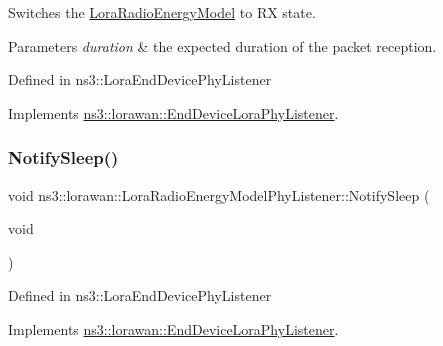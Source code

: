 Switches the \hyperlink{classns3_1_1lorawan_1_1LoraRadioEnergyModel}{Lora\+Radio\+Energy\+Model} to RX state. 


\begin{DoxyParams}{Parameters}
{\em duration} & the expected duration of the packet reception.\\
\hline
\end{DoxyParams}
Defined in ns3\+::\+Lora\+End\+Device\+Phy\+Listener 

Implements \hyperlink{classns3_1_1lorawan_1_1EndDeviceLoraPhyListener_acb82563f9dc6082e442c0ec6b1d32d94}{ns3\+::lorawan\+::\+End\+Device\+Lora\+Phy\+Listener}.

\mbox{\label{classns3_1_1lorawan_1_1LoraRadioEnergyModelPhyListener_ac4e0739b8ae8f0ed5a94eb8c5e830641}} 
\subsubsection{\texorpdfstring{Notify\+Sleep()}{NotifySleep()}}
{\footnotesize\ttfamily void ns3\+::lorawan\+::\+Lora\+Radio\+Energy\+Model\+Phy\+Listener\+::\+Notify\+Sleep (\begin{DoxyParamCaption}\item[{void}]{ }\end{DoxyParamCaption})\hspace{0.3cm}{\ttfamily [virtual]}}

Defined in ns3\+::\+Lora\+End\+Device\+Phy\+Listener 

Implements \hyperlink{classns3_1_1lorawan_1_1EndDeviceLoraPhyListener_a0e9d774b67cbddee98c5f7d76c844c65}{ns3\+::lorawan\+::\+End\+Device\+Lora\+Phy\+Listener}.

\mbox{\label{classns3_1_1lorawan_1_1LoraRadioEnergyModelPhyListener_ad5ce1283ba5c34384307338c24446876}} 

